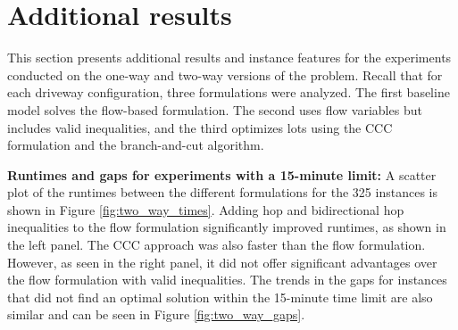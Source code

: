 \documentclass[10pt]{article}
\theoremstyle{definition}
\begin{document}
\section{Additional results}
\label{sec:add_stats}
This section presents additional results and instance features for the experiments conducted on the one-way and two-way versions of the problem. Recall that for each driveway configuration, three formulations were analyzed. The first baseline model solves the flow-based formulation. The second uses flow variables but includes valid inequalities, and the third optimizes lots using the CCC formulation and the branch-and-cut algorithm. 

\textbf{Runtimes and gaps for experiments with a 15-minute limit:}
A scatter plot of the runtimes between the different formulations for the 325 instances is shown in Figure \ref{fig:two_way_times}. Adding hop and bidirectional hop inequalities to the flow formulation significantly improved runtimes, as shown in the left panel. The CCC approach was also faster than the flow formulation. However, as seen in the right panel, it did not offer significant advantages over the flow formulation with valid inequalities. The trends in the gaps for instances that did not find an optimal solution within the 15-minute time limit are also similar and can be seen in Figure \ref{fig:two_way_gaps}.

\end{document}
